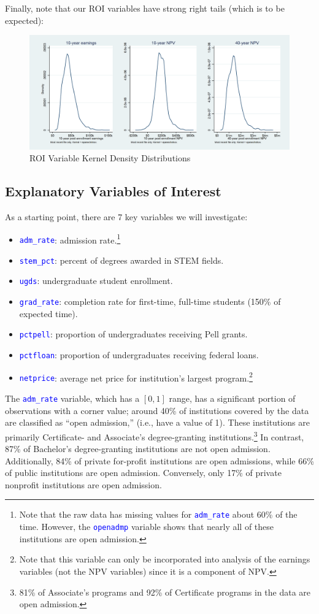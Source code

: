 \documentclass[12pt]{article}
\numberwithin{equation}{section}
\newcommand{\Varnm}[1]{\texttt{\textcolor{Blue}{#1}}}
\begin{document}
Finally, note that our ROI variables have strong right tails (which is to be expected):
\begin{figure}[h!]
\caption{ROI Variable Kernel Density Distributions}
\label{fig:full_depvar_kdensity_mr}
\includegraphics[width=7.08in]{full_depvar_kdensity_mr.png}
\centering
\end{figure}

\subsection{Explanatory Variables of Interest}
As a starting point, there are 7 key variables we will investigate:
\begin{itemize}
\item \Varnm{adm\_rate}: admission rate.\footnote{Note that the raw data has missing values for \Varnm{adm\_rate} about 60\% of the time. However, the \Varnm{openadmp} variable shows that nearly all of these institutions are open admission.}
\item \Varnm{stem\_pct}: percent of degrees awarded in STEM fields.
\item \Varnm{ugds}: undergraduate student enrollment.
\item \Varnm{grad\_rate}: completion rate for first-time, full-time students (150\% of expected time).
\item \Varnm{pctpell}: proportion of undergraduates receiving Pell grants.
\item \Varnm{pctfloan}: proportion of undergraduates receiving federal loans.
\item \Varnm{netprice}: average net price for institution's largest program.\footnote{Note that this variable can only be incorporated into analysis of the earnings variables (not the NPV variables) since it is a component of NPV.}
\end{itemize}

The \Varnm{adm\_rate} variable, which has a $[0,1]$ range, has a significant portion of observations with a corner value; around 40\% of institutions covered by the data are classified as \enquote{open admission,} (i.e., have a value of 1).  These institutions are primarily Certificate- and Associate's degree-granting institutions.\footnote{81\% of Associate's programs and 92\% of Certificate programs in the data are open admission.} In contrast, 87\% of Bachelor's degree-granting institutions are not open admission. Additionally, 84\% of private for-profit institutions are open admissions, while 66\% of public institutions are open admission. Conversely, only 17\% of private nonprofit institutions are open admission.
\end{document}
